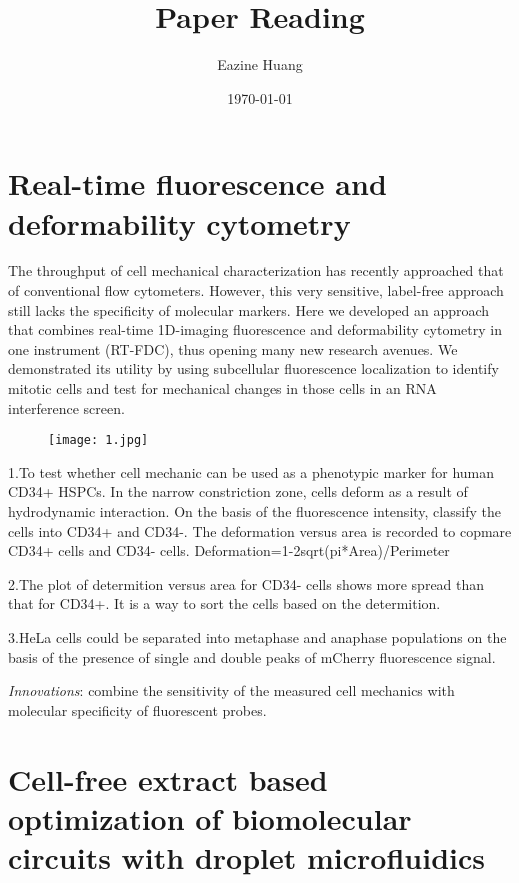 \documentclass{article}
\begin{document}
\title{Paper Reading}
\author{Eazine Huang}
\date{\today}
\maketitle

\part{Real-time fluorescence and deformability cytometry}

The throughput of cell mechanical characterization has recently approached that of conventional flow cytometers. However, this very sensitive, label-free approach still lacks the specificity of molecular markers. Here we developed an approach that combines real-time 1D-imaging fluorescence and deformability cytometry in one instrument (RT-FDC), thus opening many new research avenues. We demonstrated its utility by using subcellular fluorescence localization to identify mitotic cells and test for mechanical changes in those cells in an RNA interference screen.

\begin{figure}[H]
\centering
\texttt{[image: 1.jpg]}
\end{figure}

1.To test whether cell mechanic can be used as a phenotypic marker for human CD34+ HSPCs. In the narrow constriction zone, cells deform as a result of hydrodynamic interaction. On the basis of the fluorescence intensity, classify the cells into CD34+ and CD34-. The deformation versus area is recorded to copmare CD34+ cells and CD34- cells.
Deformation=1-2sqrt(pi*Area)/Perimeter

2.The plot of determition versus area for CD34- cells shows more spread than that for CD34+.
It is a way to sort the cells based on the determition.


3.HeLa cells could be separated into metaphase and anaphase populations on the basis of the presence of single and double peaks of mCherry fluorescence signal.

\emph{Innovations}: combine the sensitivity of the measured cell mechanics with molecular specificity of fluorescent probes.

\part{Cell-free extract based optimization of biomolecular circuits with droplet microfluidics}
\end{document}
